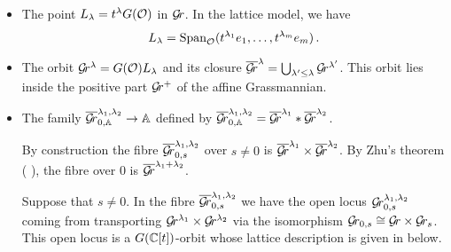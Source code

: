 \documentclass[draft]{article}
\begin{document}
% 
\begin{itemize}
    \item The point $L_\lambda = t^\lambda G(\mathcal O)$ in $\mathcal{G}\!r$. In the lattice model, we have
    $$ 
    L_\lambda = \operatorname{Span}_\mathcal O(t^{\lambda_1}e_1, \dots, t^{\lambda_m}e_m)\,. 
    $$
    \item The orbit $\mathcal{G}\!r^\lambda = G(\mathcal O) L_\lambda$ and its closure 
    $ \overline{\mathcal{G}\!r}^\lambda = \bigcup_{\lambda' \le \lambda} \mathcal{G}\!r^{\lambda'} $.  
     
    This orbit lies inside the positive part $ \mathcal{G}\!r^+$ of the affine Grassmannian.
    \item The family $ \overline{\mathcal{G}\!r}_{0,\mathbb A}^{\lambda_1, \lambda_2} \rightarrow \mathbb A$ defined by $ \overline{\mathcal{G}\!r}^{\lambda_1, \lambda_2}_{0, \mathbb A} = \overline{\mathcal{G}\!r}^{\lambda_1} \ast \overline{\mathcal{G}\!r}^{\lambda_2}$. 
    
    
    
    By construction the fibre $ \overline{\mathcal{G}\!r}_{0,s}^{\lambda_1, \lambda_2} $ over $ s \ne 0 $ is $ \overline{\mathcal{G}\!r}^{\lambda_1} \times \overline{\mathcal{G}\!r}^{\lambda_2}$.  By Zhu's theorem ( ), the fibre over $ 0 $ is $ \overline{\mathcal{G}\!r}^{\lambda_1 + \lambda_2}$.
    
    Suppose that $ s \ne 0$.  In the fibre $\overline{\mathcal{G}\!r}_{0,s}^{\lambda_1, \lambda_2}$ we have the open locus $ \mathcal{G}\!r_{0,s}^{\lambda_1, \lambda_2}$ coming from transporting $ \mathcal{G}\!r^{\lambda_1} \times \mathcal{G}\!r^{\lambda_2} $ via the isomorphism $ \mathcal{G}\!r_{0,s} \cong \mathcal{G}\!r \times \mathcal{G}\!r_s $.  This open locus is a $ G(\mathbb C[t])$-orbit
    whose lattice description is given in  below.
    

\end{itemize}
\end{document}
